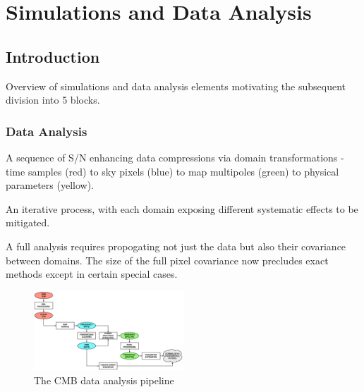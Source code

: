  
\chapter{Simulations and Data Analysis}
\renewcommand*\thesection{\arabic{section}}


\section{Introduction}

Overview of simulations and data analysis elements motivating the subsequent division into 5 blocks.

\subsection{Data Analysis}

A sequence of S/N enhancing data compressions via domain transformations - time samples (red) to sky pixels (blue) to map multipoles (green) to physical parameters (yellow).

An iterative process, with each domain exposing different systematic effects to be mitigated.

A full analysis requires propogating not just the data but also their covariance between domains. The size of the full pixel covariance now precludes exact methods except in certain special cases.

\begin{figure}[htbp]
\hspace*{3in}\includegraphics[width=0.5\textwidth]{da}
\caption{The CMB data analysis pipeline}
\label{default}

\end{figure}

\newpage

